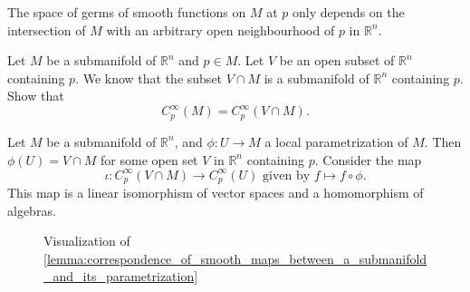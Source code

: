 \documentclass[notoc,notitlepage]{tufte-book}
\begin{document}
The space of germs of smooth functions on $M$ at $p$ only depends on the
intersection of $M$ with an arbitrary open neighbourhood of $p$ in
$\mathbb{R}^n$.

\begin{ex}
  Let $M$ be a submanifold of $\mathbb{R}^n$ and $p \in M$. Let $V$ be an open
  subset of $\mathbb{R}^n$ containing $p$. We know that the subset $V \cap M$ is
  a submanifold of $\mathbb{R}^n$ containing $p$. Show that
  \begin{equation*}
    C_p^\infty(M) = C_p^\infty(V \cap M).
  \end{equation*}
\end{ex}

\begin{lemma}\label{lemma:correspondence_of_smooth_maps_between_a_submanifold_and_its_parametrization}
  Let $M$ be a submanifold of $\mathbb{R}^n$, and $\phi : U \to M$ a local
  parametrization of $M$. Then $\phi(U) = V \cap M$ for some open set $V$ in
  $\mathbb{R}^n$ containing $p$. Consider the map
  \begin{equation*}
    \iota : C_p^\infty(V \cap M) \to C_p^\infty(U) \text{ given by } f \mapsto f
    \circ \phi.
  \end{equation*}
  This map is a linear isomorphism of vector spaces and a homomorphism of
  algebras.
\end{lemma}

\begin{figure*}[ht]
  \centering
  \caption{Visualization of
  \cref{lemma:correspondence_of_smooth_maps_between_a_submanifold_and_its_parametrization}}
  \label{fig:visualization_of_correspondence_of_smooth_maps_between_a_submanifold_and_its_parametrization}
\end{figure*}
\end{document}
